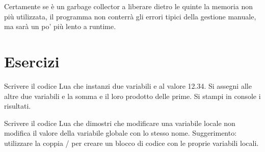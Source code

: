 Certamente se è un garbage collector a liberare dietro le quinte la memoria non
più utilizzata, il programma non conterrà gli errori tipici della gestione
manuale, ma sarà un po' più lento a runtime.


\section{Esercizi}

\begin{Exercise}[label=fond-01]
Scrivere il codice Lua che instanzi due variabili  e  al valore
12.34. Si assegni alle altre due variabili  e  la somma e il
loro prodotto delle prime. Si stampi in console i risultati.
\end{Exercise}

\begin{Exercise}[label=fond-02]
Scrivere il codice Lua che dimostri che modificare una variabile locale non
modifica il valore della variabile globale con lo stesso nome. Suggerimento:
utilizzare la coppia / per creare un blocco di codice con le
proprie variabili locali.
\end{Exercise}

